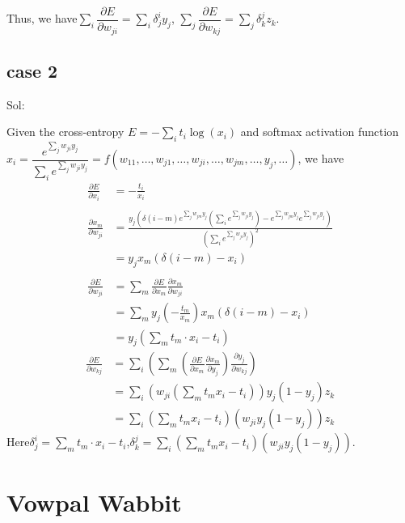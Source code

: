 \documentclass[a4paper,12pt]{article}
\begin{document}
Thus, we have\qquad $\sum_{i} \dfrac{\partial E}{\partial w_{ji}} = \sum_i \delta_j^i y_j$, \qquad $\sum_{j} \dfrac{\partial E}{\partial w_{kj}} = \sum_j \delta_k^j z_k$. 

\subsection{case 2}

Sol:

Given the cross-entropy $E = -\sum_i t_i \log(x_i)$ and softmax activation function $x_i = \dfrac{e^{\sum_{j} w_{ji} y_j}}{\sum_{i} e^{\sum_{j} w_{ji}y_j}} = f(w_{11}, \ldots , w_{j1}, \ldots, w_{ji}, \ldots,  w_{jm}, \ldots , y_j, \ldots)$, we have
\begin{align}
\frac{\partial E}{\partial x_i} &= - \frac{t_i}{x_i} \nonumber \\
\quad  \nonumber \\
\frac{\partial x_m}{\partial w_{ji}} & =  \frac{y_j(\delta(i-m) e^{\sum_{j}w_{jm}y_j}( \sum_{i}e^{\sum_{j}w_{ji}y_j} ) - e^{\sum_{j}w_{jm}y_j} e^{\sum_{j}w_{ji}y_j})}{(\sum_{i} e^{\sum_{j} w_{ji}y_j})^2}   \nonumber  \\
& = y_j x_m( \delta(i-m) - x_i)  \nonumber \\
\nonumber \\
\frac{\partial E}{\partial w_{ji}} & = \sum_{m} \frac{\partial E}{\partial x_m} \frac{\partial x_m}{\partial w_{ji}}   \nonumber \\
& = \sum_{m} y_j (-\frac{t_m}{x_m}) x_m( \delta(i - m) - x_i)  \nonumber \\
& = y_j (\sum_{m} t_m \cdot x_i - t_i) \nonumber 
\end{align}
\begin{align}
\frac{\partial E}{\partial w_{kj}} & = \sum_{i}( \sum_{m} (\frac{\partial E}{\partial x_m} \frac{\partial x_m}{\partial y_j}) \frac{\partial y_j}{\partial w_{kj}} ) \nonumber \\
& = \sum_{i} (w_{ji} (\sum_{m} t_m x_i - t_i)) y_j (1 - y_j) z_k \nonumber \\
& =  \sum_{i}(\sum_{m} t_m x_i - t_i)(w_{ji} y_j(1- y_j)) z_k \nonumber
\end{align}
Here\quad$\delta_j^i = \sum_{m} t_m \cdot x_i - t_i$,\quad$\delta_k^j =  \sum_{i}(\sum_{m} t_m x_i - t_i)(w_{ji} y_j(1- y_j))$. 

\section{Vowpal Wabbit}
\end{document}
